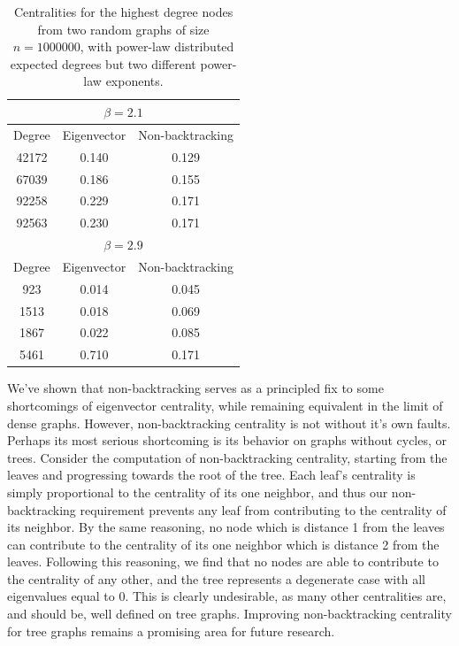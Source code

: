 \documentclass[twocolumn,prl,superscriptaddress]{revtex4}
\begin{document}
\begin{table}
\centering
\begin{tabular}{|c|c|c|} \hline
\multicolumn{3}{|c|}{$\beta=2.1$} \\ \hline
Degree & Eigenvector & Non-backtracking \\ \hline
42172 & 0.140 & 0.129 \\ \hline
67039 & 0.186 & 0.155 \\ \hline
92258 & 0.229 & 0.171 \\ \hline
92563 & 0.230 & 0.171 \\ \hline \hline
\multicolumn{3}{|c|}{$\beta=2.9$} \\ \hline 
Degree & Eigenvector & Non-backtracking \\ \hline
923  & 0.014 & 0.045 \\ \hline
1513 & 0.018 & 0.069 \\ \hline
1867 & 0.022 & 0.085 \\ \hline
5461 & 0.710 & 0.171 \\ \hline
\end{tabular}
\caption{Centralities for the highest degree nodes from two random graphs of size $n=1000000$, with power-law distributed expected degrees but two different power-law exponents.}
\label{tab:power}
\end{table}

We've shown that non-backtracking serves as a principled fix to some shortcomings of eigenvector centrality, while remaining equivalent in the limit of dense graphs. However, non-backtracking centrality is not without it's own faults. Perhaps its most serious shortcoming is its behavior on graphs without cycles, or trees. Consider the computation of non-backtracking centrality, starting from the leaves and progressing towards the root of the tree. Each leaf's centrality is simply proportional to the centrality of its one neighbor, and thus our non-backtracking requirement prevents any leaf from contributing to the centrality of its neighbor. By the same reasoning, no node which is distance 1 from the leaves can contribute to the centrality of its one neighbor which is distance 2 from the leaves. Following this reasoning, we find that no nodes are able to contribute to the centrality of any other, and the tree represents a degenerate case with all eigenvalues equal to 0. This is clearly undesirable, as many other centralities are, and should be, well defined on tree graphs. Improving non-backtracking centrality for tree graphs remains a promising area for future research.



\end{document}
